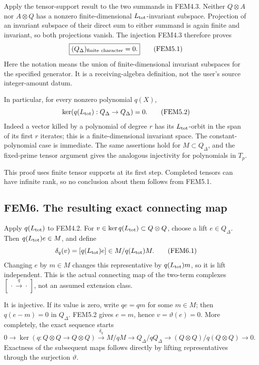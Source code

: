 Apply the tensor-support result to the two summands in FEM4.3. Neither
\(Q\otimes A\) nor \(A\otimes Q\) has a nonzero finite-dimensional
\(L_{\rm tot}\)-invariant subspace. Projection of an invariant subspace
of their direct sum to either summand is again finite and invariant, so
both projections vanish. The injection FEM4.3 therefore proves \[
\boxed{(Q_\Delta)_{\rm finite\ character}=0.}
\tag{FEM5.1}
\] Here the notation means the union of finite-dimensional invariant
subspaces for the specified generator. It is a receiving-algebra
definition, not the user's source integer-amount datum.

In particular, for every nonzero polynomial \(q(X)\), \[
\ker(q(L_{\rm tot}):Q_\Delta\to Q_\Delta)=0.
\tag{FEM5.2}
\] Indeed a vector killed by a polynomial of degree \(r\) has its
\(L_{\rm tot}\)-orbit in the span of its first \(r\) iterates; this is a
finite-dimensional invariant space. The constant-polynomial case is
immediate. The same assertions hold for \(M\subset Q_\Delta\), and the
fixed-prime tensor argument gives the analogous injectivity for
polynomials in \(T_p\).

This proof uses finite tensor supports at its first step. Completed
tensors can have infinite rank, so no conclusion about them follows from
FEM5.1.

\subsection{FEM6. The resulting exact connecting
map}\label{fem6.-the-resulting-exact-connecting-map}

Apply \(q(L_{\rm tot})\) to FEM4.2. For
\(v\in\ker q(L_{\rm tot})\subset Q\otimes Q\), choose a lift
\(e\in Q_\Delta\). Then \(q(L_{\rm tot})e\in M\), and define \[
\delta_q(v)=[q(L_{\rm tot})e]\in M/q(L_{\rm tot})M.
\tag{FEM6.1}
\] Changing \(e\) by \(m\in M\) changes this representative by
\(q(L_{\rm tot})m\), so it is lift independent. This is the actual
connecting map of the two-term complexes
\([\,\cdot\xrightarrow q\cdot\,]\), not an assumed extension class.

It is injective. If its value is zero, write \(q e=q m\) for some
\(m\in M\); then \(q(e-m)=0\) in \(Q_\Delta\). FEM5.2 gives \(e=m\),
hence \(v=\vartheta(e)=0\). More completely, the exact sequence starts
\[
0\to\ker(q:Q\otimes Q\to Q\otimes Q)
 \xrightarrow{\delta_q}M/qM
 \longrightarrow Q_\Delta/qQ_\Delta
 \longrightarrow (Q\otimes Q)/q(Q\otimes Q)\to0.
\tag{FEM6.2}
\] Exactness of the subsequent maps follows directly by lifting
representatives through the surjection \(\vartheta\).

